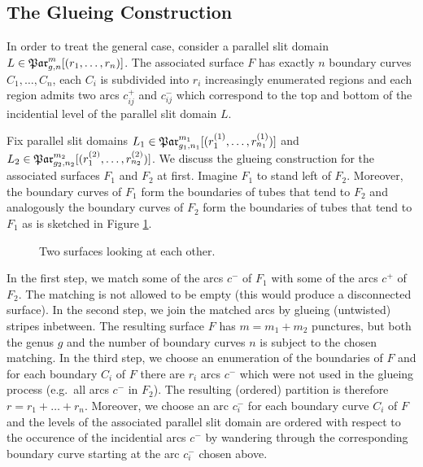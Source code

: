 \subsection{The Glueing Construction}
In order to treat the general case, consider a parallel slit domain $L \in \Parr$.
The associated surface $F$ has exactly $n$ boundary curves $C_1, \ldots, C_n$,
each $C_i$ is subdivided into $r_i$ increasingly enumerated regions and each region admits two arcs $c^+_{ij}$ and $c^-_{ij}$ which correspond to the top and bottom
of the incidential level of the parallel slit domain $L$.

Fix parallel slit domains $L_1 \in \Par_{g_1, n_1}^{m_1}[(r_1^{(1)}, \ldots, r_{n_1}^{(1)})]$ and $L_2 \in \Par_{g_2, n_2}^{m_2}[(r_1^{(2)}, \ldots, r_{n_2}^{(2)})]$.
We discuss the glueing construction for the associated surfaces $F_1$ and $F_2$ at first.
Imagine $F_1$ to stand left of $F_2$.
Moreover, the boundary curves of $F_1$ form the boundaries of tubes that tend to $F_2$ and analogously 
the boundary curves of $F_2$ form the boundaries of tubes that tend to $F_1$ 
as is sketched in Figure \ref{homology_operations:parallel_patching_slit_pics:general_glueing_two_surfaces_look_at_each_other}.
\begin{figure}[ht]
    \centering
    \def\svgwidth{\columnwidth}
    
    \caption{\label{homology_operations:parallel_patching_slit_pics:general_glueing_two_surfaces_look_at_each_other}Two surfaces looking at each other.}
\end{figure}

In the first step, we match some of the arcs $c^-$ of $F_1$ with some of the arcs $c^+$ of $F_2$.
The matching is not allowed to be empty (this would produce a disconnected surface).
In the second step, we join the matched arcs by glueing (untwisted) stripes inbetween.
The resulting surface $F$ has $m= m_1+m_2$ punctures, but both the genus $g$ and the number of boundary curves $n$ is subject to the chosen matching.
In the third step, we choose an enumeration of the boundaries of $F$ and for each boundary $C_i$ of $F$
there are $r_i$ arcs $c^-$ which were not used in the glueing process (e.g.\ all arcs $c^-$ in $F_2$).
The resulting (ordered) partition is therefore $r = r_1 + \ldots +r_n$.
Moreover, we choose an arc $c^-_i$ for each boundary curve $C_i$ of $F$ and
the levels of the associated parallel slit domain are ordered with respect to the occurence of the incidential arcs $c^-$
by wandering through the corresponding boundary curve starting at the arc $c^-_i$ chosen above.

